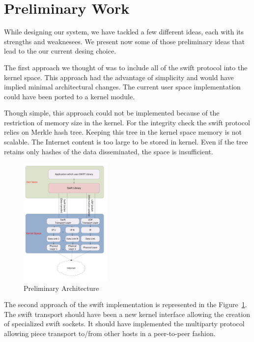 \section{Preliminary Work}
\label{subsec:multiparty:preliminary-work}

While designing our system, we have tackled a few different ideas, each with
its strengths and weaknesees. We present now some of those preliminary ideas
that lead to the our current desing choice.

The first approach we thought of was to include all of the swift protocol into
the kernel space. This approach had the advantage of simplicity and would have
implied minimal architectural changes. The current user space implementation
could have been ported to a kernel module.

Though simple, this approach could not be implemented because of the
restriction of memory size in the kernel.  For the integrity check the swift
protocol relies on Merkle hash tree. Keeping this tree in the kernel space
memory is not scalable. The Internet content is too large to be stored in
kernel. Even if the tree retains only hashes of the data disseminated, the
space is insufficient.

\begin{figure}
  \centering
  \includegraphics[width=0.4\textwidth]{src/img/multiparty/preliminary-architecture}
  \caption{Preliminary Architecture}
  \label{fig:multiparty:preliminary-architecture}
\end{figure}

The second approach of the swift implementation is represented in the
Figure~\ref{fig:multiparty:preliminary-architecture}. The swift transport
should have been a new kernel interface allowing the creation of specialized
swift sockets. It should have implemented the multiparty protocol allowing
piece transport to/from other hosts in a peer-to-peer fashion.

